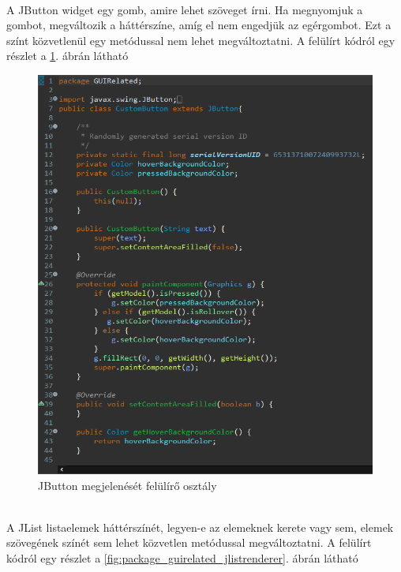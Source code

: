 \vspace{5pt}\\A JButton widget egy gomb, amire lehet szöveget írni. Ha megnyomjuk a gombot, megváltozik a háttérszíne, amíg el nem engedjük az egérgombot. Ezt a színt közvetlenül egy metódussal nem lehet megváltoztatni. A felülírt kódról egy részlet a \ref{fig:package_guirelated_jbutton}. ábrán látható
\begin{figure}[h]
	\centering
	\includegraphics[scale=0.3]{images/package_guirelated_jbutton_details.png}
	\caption{JButton megjelenését felülírő osztály}
	\label{fig:package_guirelated_jbutton}
\end{figure}
\\A JList listaelemek háttérszínét, legyen-e az elemeknek kerete vagy sem, elemek szövegének színét sem lehet közvetlen metódussal megváltoztatni. A felülírt kódról egy részlet a \ref{fig:package_guirelated_jlistrenderer}. ábrán látható
